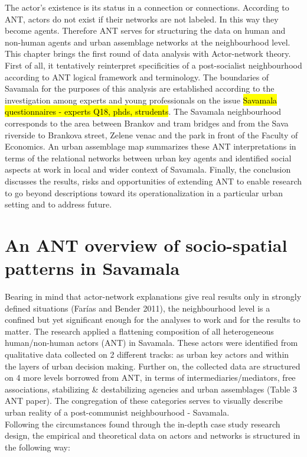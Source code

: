 \documentclass[11pt]{report}
\begin{document}
The actor’s existence is its status in a connection or connections. According to ANT, actors do not exist if their networks are not labeled. In this way they become agents.
Therefore ANT serves for structuring the data on human and non-human agents and urban assemblage networks at the neighbourhood level.
\\
This chapter brings the first round of data analysis with Actor-network theory.
First of all, it tentatively reinterpret specificities of a post-socialist neighbourhood according to ANT logical framework and terminology. 
The boundaries of Savamala for the purposes of this analysis are established according to the investigation among experts and young professionals on the issue \hl{Savamala questionnaires - experts Q18, phds, strudents}. The Savamala neighbourhood corresponds to the area between Brankov and tram bridges and from the Sava riverside to Brankova street, Zelene venac and the park in front of the Faculty of Economics.
An urban assemblage map summarizes these ANT interpretations in terms of the relational networks between urban key agents and identified social aspects at work in local and wider context of Savamala.
Finally, the conclusion discusses the results, risks and opportunities of extending ANT to enable research to go beyond descriptions toward its operationalization in a particular urban setting and to address future.

\section{An ANT overview of socio-spatial patterns in Savamala}

Bearing in mind that actor-network explanations give real results only in strongly defined situations (Farías and Bender 2011), the neighbourhood level  is a confined but yet significant enough for the analyses to work and for the results to matter.
The research applied a flattening composition of all heterogeneous human/non-human actors (ANT)  in Savamala.
These actors were identified from qualitative data collected on 2 different tracks: as urban key actors and within the layers of urban decision making.
Further on, the collected data are structured on 4 more levels borrowed from ANT, in terms of intermediaries/mediators, free associations, stabilizing \& destabilizing agencies and urban assemblages (Table 3 ANT paper).
The congregation of these categories serves to visually describe urban reality of a post-communist neighbourhood - Savamala.
\\
Following the circumstances found through the in-depth case study research design, the empirical and theoretical data on actors and networks is structured in the following way:
\end{document}
